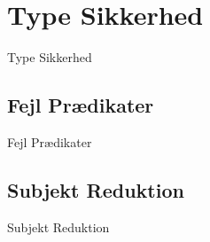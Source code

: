 \section{Type Sikkerhed}
\begin{frame}{Type Sikkerhed}

\end{frame}

\subsection{Fejl Prædikater}
\begin{frame}{Fejl Prædikater}

\end{frame}

\subsection{Subjekt Reduktion}
\begin{frame}{Subjekt Reduktion}

\end{frame}